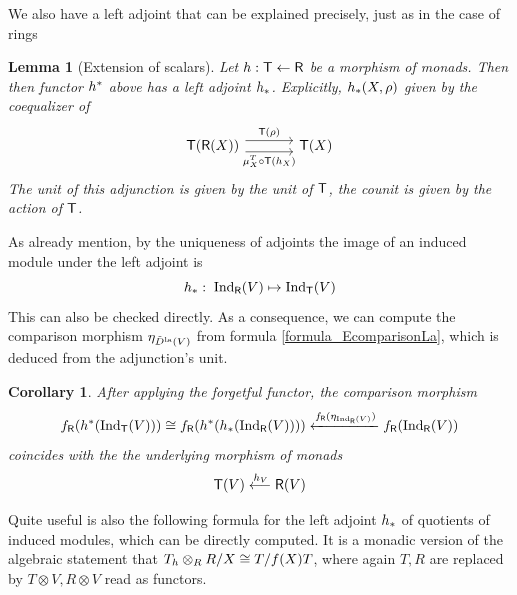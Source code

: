\documentclass[a4paper, reqno]{amsart}
\newtheorem{corollary}[theorem]{Corollary}
\newtheorem{lemma}[theorem]{Lemma}
\theoremstyle{introTheorems}
\renewcommand{\1}{\mathbbold{1}}
\begin{document}
We also have a left adjoint that can be explained precisely, just as in the case of rings

\begin{lemma}[Extension of scalars]\label{lm_monadExtensionOfScalars}
    Let $h:{\mathsf{T}}\leftarrow {\mathsf{R}}$ be a morphism of monads. Then then functor $h^*$ above has a left adjoint $h_*$. Explicitly, $h_*(X,\rho) $ given by the coequalizer of
\[\begin{tikzcd}[row sep=6ex, column sep=8ex]
\monT(\monR(X))
\arrow[r,  shift left=4pt,"\monT(\rho)"] 
\arrow[r, swap,shift right=4pt,"\mu^T_X\circ \monT(\fpullback_X)"]
& 
\monT(X)
\end{tikzcd}\]
The unit of this adjunction is given by the unit of ${\mathsf{T}}$, the counit is given by the action of ${\mathsf{T}}$. 
\end{lemma}

As already mention, by the uniqueness of adjoints the image of an induced module under the left adjoint is 
$$h_*:\; \textup{Ind}_{{\mathsf{R}}}(V)\mapsto \textup{Ind}_{\mathsf{T}}(V)$$
This can also be checked directly. As a consequence, we can compute the comparison morphism $\eta_{\tilde{D}^{\mathrm{la}}(V)}$ from formula \eqref{formula_EcomparisonLa}, which is deduced from the adjunction's unit.
\begin{corollary}\label{cor:monadComparisonPullback}
After applying the forgetful functor, the comparison morphism  
$$
f_{\mathsf{R}}(h^*(\textup{Ind}_{\mathsf{T}}(V)))
\cong
f_{\mathsf{R}}(h^*(h_*(\textup{Ind}_{{\mathsf{R}}}(V))))
\xleftarrow{f_{\mathsf{R}}(\eta_{\textup{Ind}_{{\mathsf{R}}}(V)})}
f_{\mathsf{R}}(\textup{Ind}_{{\mathsf{R}}}(V))
$$
coincides with the the underlying morphism of monads
$$
{\mathsf{T}}(V)
\stackrel{\,h_V}{\longleftarrow}
{\mathsf{R}}(V)
$$
\end{corollary}








Quite useful is also the following formula for the left adjoint $h_*$ of quotients of induced modules, which can be directly computed. It is a monadic version of the algebraic statement that $T_h\otimes_R R/X\cong T/f(X)T$, where again $T,R$ are replaced by $T\otimes V,R\otimes V$ read as functors. 
\end{document}
